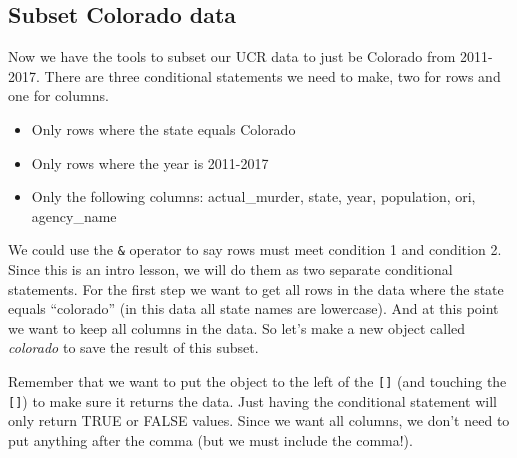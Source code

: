 \documentclass[
]{krantz}
\makeatletter
\newenvironment{Shaded}{\begin{snugshade}}{\end{snugshade}}
\newcommand{\CommentTok}[1]{\textcolor[rgb]{0.37,0.37,0.37}{\textit{#1}}}
\newcommand{\DecValTok}[1]{\textcolor[rgb]{0.06,0.06,0.06}{#1}}
\newcommand{\NormalTok}[1]{#1}
\newcommand{\OtherTok}[1]{\textcolor[rgb]{0.37,0.37,0.37}{#1}}
\newcommand{\SpecialCharTok}[1]{\textcolor[rgb]{0,0,0}{#1}}
\newcommand{\StringTok}[1]{\textcolor[rgb]{0.5,0.5,0.5}{#1}}
\providecommand{\tightlist}{%
  \setlength{\itemsep}{0pt}\setlength{\parskip}{0pt}}
\newenvironment{kframe}{%
\medskip{}
\setlength{\fboxsep}{.8em}
 \def\at@end@of@kframe{}%
 \ifinner\ifhmode%
  \def\at@end@of@kframe{\end{minipage}}%
  \begin{minipage}{\columnwidth}%
 \fi\fi%
 \def\FrameCommand##1{\hskip\@totalleftmargin \hskip-\fboxsep
 \colorbox{shadecolor}{##1}\hskip-\fboxsep
     \hskip-\linewidth \hskip-\@totalleftmargin \hskip\columnwidth}%
 \MakeFramed {\advance\hsize-\width
   \@totalleftmargin\z@ \linewidth\hsize
   \@setminipage}}%
 {\par\unskip\endMakeFramed%
 \at@end@of@kframe}
\renewenvironment{Shaded}{\begin{kframe}}{\end{kframe}}
\makeatother
\begin{document}
\begin{Shaded}
\end{Shaded}

\hypertarget{subset-colorado-data}{%
\subsection{Subset Colorado
data}\label{subset-colorado-data}}

Now we have the tools to subset our UCR data to just be
Colorado from 2011-2017. There are three conditional
statements we need to make, two for rows and one for
columns.

\begin{itemize}
\tightlist
\item
  Only rows where the state equals Colorado
\item
  Only rows where the year is 2011-2017
\item
  Only the following columns: actual\_murder, state, year,
  population, ori, agency\_name
\end{itemize}

We could use the \texttt{\&} operator to say rows must meet
condition 1 and condition 2. Since this is an intro lesson,
we will do them as two separate conditional statements. For
the first step we want to get all rows in the data where the
state equals ``colorado'' (in this data all state names are
lowercase). And at this point we want to keep all columns in
the data. So let's make a new object called \emph{colorado}
to save the result of this subset.

Remember that we want to put the object to the left of the
\texttt{{[}{]}} (and touching the \texttt{{[}{]}}) to make
sure it returns the data. Just having the conditional
statement will only return TRUE or FALSE values. Since we
want all columns, we don't need to put anything after the
comma (but we must include the comma!).

\begin{Shaded}
\end{Shaded}
\end{document}
